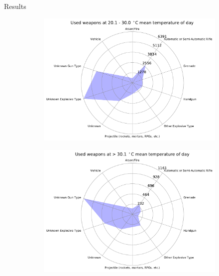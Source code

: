 \documentclass{beamer}
\begin{document}
\begin{frame}{Results}
\begin{figure}
\begin{subfigure}[b]{0.3\textwidth}
			\includegraphics[width=\textwidth]{Temp-Weapon/temp201-300_starDiagram}
		\end{subfigure}
		\begin{subfigure}[b]{0.3\textwidth}
			\includegraphics[width=\textwidth]{Temp-Weapon/temp>301_starDiagram}
		\end{subfigure}
	\end{figure}
	
\end{frame}
\end{document}
